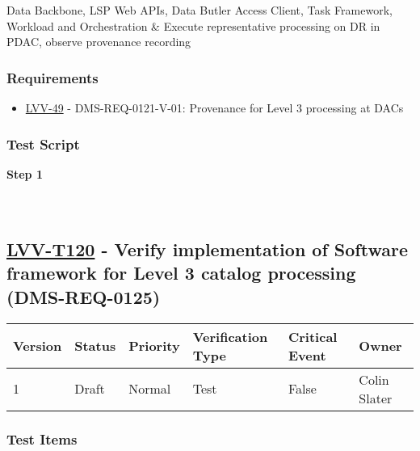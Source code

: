 Data Backbone, LSP Web APIs, Data Butler Access Client, Task Framework,
Workload and Orchestration \& Execute representative processing on DR in
PDAC, observe provenance recording

\hypertarget{requirements-96}{%
\subsubsection{Requirements}\label{requirements-96}}

\begin{itemize}
\tightlist
\item
  \href{https://jira.lsstcorp.org/browse/LVV-49}{LVV-49} -
  DMS-REQ-0121-V-01: Provenance for Level 3 processing at DACs
\end{itemize}

\hypertarget{test-script-96}{%
\subsubsection{Test Script}\label{test-script-96}}

\textbf{Step 1}\\
~\\
~\\

\hypertarget{lvv-t120---verify-implementation-of-software-framework-for-level-3-catalog-processing-dms-req-0125}{%
\subsection{\texorpdfstring{\href{https://jira.lsstcorp.org/secure/Tests.jspa\#/testCase/LVV-T120}{LVV-T120}
- Verify implementation of Software framework for Level 3 catalog
processing
(DMS-REQ-0125)}{LVV-T120 - Verify implementation of Software framework for Level 3 catalog processing (DMS-REQ-0125)}}\label{lvv-t120---verify-implementation-of-software-framework-for-level-3-catalog-processing-dms-req-0125}}

\begin{longtable}[]{@{}llllll@{}}
\toprule
Version & Status & Priority & Verification Type & Critical Event &
Owner\tabularnewline
\midrule
\endhead
1 & Draft & Normal & Test & False & Colin Slater\tabularnewline
\bottomrule
\end{longtable}

\hypertarget{test-items-96}{%
\subsubsection{Test Items}\label{test-items-96}}

